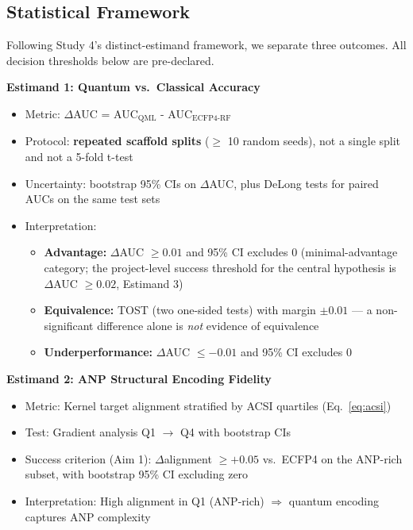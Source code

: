 \documentclass[11pt,a4paper]{article}
\begin{document}
\subsection{Statistical Framework}
\label{sec:stats}

Following Study 4's distinct-estimand framework, we separate three outcomes. All decision thresholds below are pre-declared.

\textbf{Estimand 1: Quantum vs.\ Classical Accuracy}
\begin{itemize}
    \item Metric: $\Delta$AUC = AUC$_{\text{QML}}$ - AUC$_{\text{ECFP4-RF}}$
    \item Protocol: \textbf{repeated scaffold splits} ($\geq$ 10 random seeds), not a single split and not a 5-fold t-test
    \item Uncertainty: bootstrap 95\% CIs on $\Delta$AUC, plus DeLong tests for paired AUCs on the same test sets \cite{delong1988}
    \item Interpretation:
    \begin{itemize}
        \item \textbf{Advantage:} $\Delta$AUC $\geq 0.01$ and 95\% CI excludes 0 (minimal-advantage category; the project-level success threshold for the central hypothesis is $\Delta$AUC $\geq 0.02$, Estimand 3)
        \item \textbf{Equivalence:} TOST (two one-sided tests) with margin $\pm 0.01$ \cite{lakens2017} --- a non-significant difference alone is \textit{not} evidence of equivalence
        \item \textbf{Underperformance:} $\Delta$AUC $\leq -0.01$ and 95\% CI excludes 0
    \end{itemize}
\end{itemize}

\textbf{Estimand 2: ANP Structural Encoding Fidelity}
\begin{itemize}
    \item Metric: Kernel target alignment stratified by ACSI quartiles (Eq.\ \ref{eq:acsi})
    \item Test: Gradient analysis Q1 $\rightarrow$ Q4 with bootstrap CIs
    \item Success criterion (Aim 1): $\Delta$alignment $\geq +0.05$ vs.\ ECFP4 on the ANP-rich subset, with bootstrap 95\% CI excluding zero
    \item Interpretation: High alignment in Q1 (ANP-rich) $\Rightarrow$ quantum encoding captures ANP complexity
\end{itemize}
\end{document}

